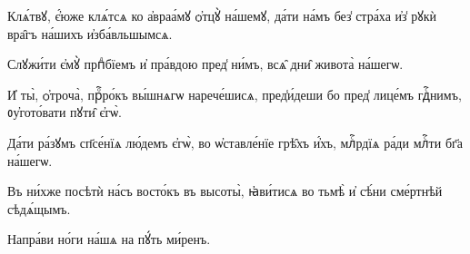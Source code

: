\hKv Клѧ́твꙋ, є҆́юже клѧ́тсѧ ко а҆враа́мꙋ ѻ҆тцꙋ̀  на́шемꙋ, да́ти на́мъ без̾ стра́ха и҆з̾ рꙋкѝ вра̑гъ  на́шихъ и҆зба́вльшымсѧ. 

\hKv Слꙋжи́ти є҆мꙋ̀ прпⷣбїемъ и҆ пра́вдою пред̾ ни́мъ, всѧ̑  дни̑ живота̀ на́шегѡ. 
%

\hKv И҆ ты̀, ѻ҆троча̀, прⷪ҇ро́къ вы́шнѧгѡ нарече́шисѧ,  пред̾и́деши бо пред̾ лице́мъ гдⷭ҇нимъ, ᲂу҆гото́вати пꙋти̑  є҆гѡ̀. 

\hKv Да́ти ра́зꙋмъ сп҃се́нїѧ лю́демъ є҆гѡ̀, во ѡ҆ставле́нїе  грѣ̑хъ и҆́хъ, млⷭ҇рдїѧ ра́ди млⷭ҇ти бг҃а на́шегѡ. 
%

\hKv Въ ни́хже посѣтѝ на́съ восто́къ въ высоты̀,  ꙗ҆ви́тисѧ во тьмѣ̀ и҆ сѣ́ни сме́ртнѣй сѣдѧ́щымъ. 

\hKv Напра́ви но́ги на́шѧ на пꙋ́ть ми́ренъ. 


